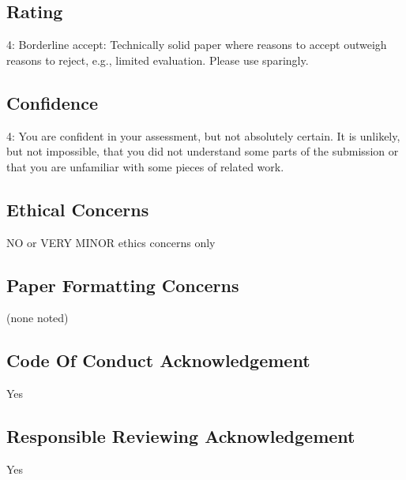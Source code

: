 \documentclass[11pt]{article}
\begin{document}
\subsection*{Rating}
4: Borderline accept: Technically solid paper where reasons to accept outweigh reasons to reject, e.g., limited evaluation. Please use sparingly.

\subsection*{Confidence}
4: You are confident in your assessment, but not absolutely certain. It is unlikely, but not impossible, that you did not understand some parts of the submission or that you are unfamiliar with some pieces of related work.

\subsection*{Ethical Concerns}
NO or VERY MINOR ethics concerns only

\subsection*{Paper Formatting Concerns}
(none noted)

\subsection*{Code Of Conduct Acknowledgement}
Yes

\subsection*{Responsible Reviewing Acknowledgement}
Yes
\end{document}
